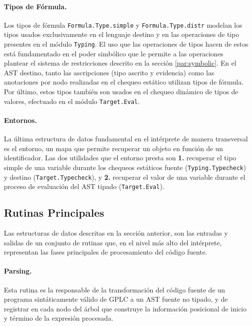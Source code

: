 \paragraph{Tipos de Fórmula.} Los tipos de fórmula
\verb|Formula.Type.simple| y \verb|Formula.Type.distr| modelan los
tipos usados exclusivamente en el lenguaje destino y en las
operaciones de tipo presentes en el módulo \verb|Typing|. El uso que
las operaciones de tipos hacen de estos está fundamentado en el poder
simbólico que le permite a las operaciones plantear el sistema de
restricciones descrito en la sección \ref{par:symbolic}. En el AST
destino, tanto las ascripciones (tipo ascrito y evidencia) como las
anotaciones por nodo realizadas en el chequeo estático utilizan tipos
de fórmula. Por último, estos tipos también son usados en el chequeo
dinámico de tipos de valores, efectuado en el módulo
\verb|Target.Eval|.

\paragraph{Entornos.} La última estructura de datos fundamental en el
intérprete de manera transversal es el entorno, un mapa que permite
recuperar un objeto en función de un identificador. Las dos utilidades
que el entorno presta son \textbf{1.} recuperar el tipo simple de una
variable durante los chequeos estáticos fuente
(\verb|Typing.Typecheck|) y destino (\verb|Target.Typecheck|), y
\textbf{2.} recuperar el valor de una variable durante el proceso de
evaluación del AST tipado (\verb|Target.Eval|).

\subsection{Rutinas Principales}

Las estructuras de datos descritas en la sección
anterior, son las entradas y salidas de un conjunto de rutinas que, en el
nivel más alto del intérprete, representan las fases principales de
procesamiento del código fuente.

\paragraph{Parsing.} Esta rutina es la responsable de la transformación
del código fuente de un programa sintáticamente válido de GPLC a un
AST fuente no tipado, y de registrar en cada nodo del árbol  que construye
la información posicional de inicio y término de la expresión procesada.


